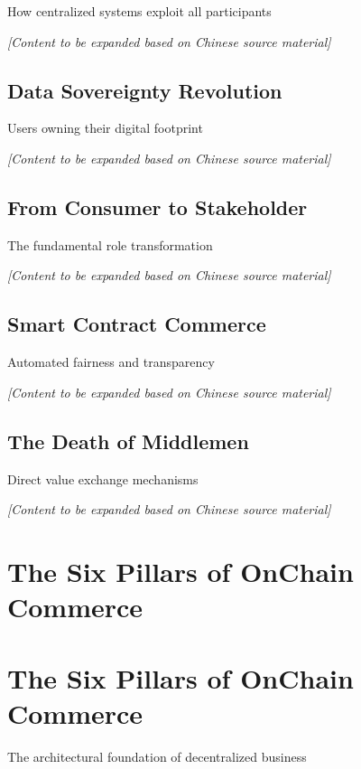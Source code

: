 \documentclass[
  Letterpaper,
]{scrbook}
\begin{document}
How centralized systems exploit all participants

\emph{{[}Content to be expanded based on Chinese source material{]}}

\section{Data Sovereignty Revolution}\label{data-sovereignty-revolution}

Users owning their digital footprint

\emph{{[}Content to be expanded based on Chinese source material{]}}

\section{From Consumer to
Stakeholder}\label{from-consumer-to-stakeholder}

The fundamental role transformation

\emph{{[}Content to be expanded based on Chinese source material{]}}

\section{Smart Contract Commerce}\label{smart-contract-commerce}

Automated fairness and transparency

\emph{{[}Content to be expanded based on Chinese source material{]}}

\section{The Death of Middlemen}\label{the-death-of-middlemen}

Direct value exchange mechanisms

\emph{{[}Content to be expanded based on Chinese source material{]}}

\chapter{The Six Pillars of OnChain
Commerce}\label{the-six-pillars-of-onchain-commerce-1}

\chapter{The Six Pillars of OnChain Commerce}\label{sec-six-pillars}

The architectural foundation of decentralized business
\end{document}
